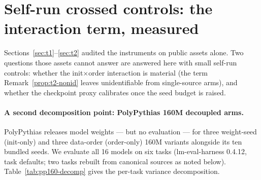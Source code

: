 
\section{Self-run crossed controls: the interaction term, measured}
\label{app:crossed}

Sections~\ref{sec:t1}--\ref{sec:t2} audited the instruments on public assets alone. Two
questions those assets cannot answer are answered here with small self-run controls: whether
the init$\times$order interaction is material (the term Remark~\ref{prop:t2-nonid} leaves
unidentifiable from single-source arms), and whether the checkpoint proxy calibrates once the
seed budget is raised.

\paragraph{A second decomposition point: PolyPythias 160M decoupled arms.}
PolyPythias releases model weights --- but no evaluation --- for three weight-seed (init-only)
and three data-order (order-only) 160M variants alongside its ten bundled seeds. We evaluate
all 16 models on six tasks (lm-eval-harness 0.4.12, task defaults; two tasks rebuilt from
canonical sources as noted below). Table~\ref{tab:pp160-decomp} gives the per-task variance
decomposition.

